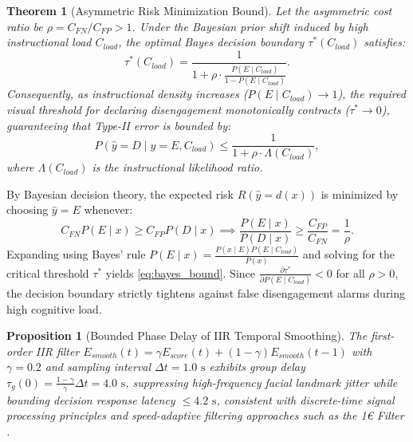 \documentclass[conference]{IEEEtran}
\newtheorem{theorem}{Theorem}
\newtheorem{proposition}{Proposition}
\begin{document}
\begin{theorem}[Asymmetric Risk Minimization Bound]
Let the asymmetric cost ratio be $\rho = C_{FN} / C_{FP} > 1$. Under the Bayesian prior shift induced by high instructional load $C_{load}$, the optimal Bayes decision boundary $\tau^*(C_{load})$ satisfies:
\begin{equation}
\tau^*(C_{load}) = \frac{1}{1 + \rho \cdot \frac{P(E \mid C_{load})}{1 - P(E \mid C_{load})}}.
\label{eq:bayes_bound}
\end{equation}
Consequently, as instructional density increases ($P(E \mid C_{load}) \to 1$), the required visual threshold for declaring disengagement monotonically contracts ($\tau^* \to 0$), guaranteeing that Type-II error is bounded by:
\begin{equation}
P(\hat{y}=D \mid y=E, C_{load}) \le \frac{1}{1 + \rho \cdot \Lambda(C_{load})},
\end{equation}
where $\Lambda(C_{load})$ is the instructional likelihood ratio.
\end{theorem}

\begin{IEEEproof}
By Bayesian decision theory, the expected risk $R(\hat{y}=d(x))$ is minimized by choosing $\hat{y}=E$ whenever:
\begin{equation}
C_{FN} P(E \mid x) \ge C_{FP} P(D \mid x) \implies \frac{P(E \mid x)}{P(D \mid x)} \ge \frac{C_{FP}}{C_{FN}} = \frac{1}{\rho}.
\end{equation}
Expanding using Bayes' rule $P(E \mid x) = \frac{P(x \mid E) P(E \mid C_{load})}{P(x)}$ and solving for the critical threshold $\tau^*$ yields \eqref{eq:bayes_bound}. Since $\frac{\partial \tau^*}{\partial P(E \mid C_{load})} < 0$ for all $\rho > 0$, the decision boundary strictly tightens against false disengagement alarms during high cognitive load.
\end{IEEEproof}

\begin{proposition}[Bounded Phase Delay of IIR Temporal Smoothing]
The first-order IIR filter $E_{smooth}(t) = \gamma E_{score}(t) + (1-\gamma) E_{smooth}(t-1)$ with $\gamma = 0.2$ and sampling interval $\Delta t = 1.0\text{ s}$ exhibits group delay $\tau_g(0) = \frac{1-\gamma}{\gamma} \Delta t = 4.0\text{ s}$, suppressing high-frequency facial landmark jitter while bounding decision response latency $\le 4.2\text{ s}$, consistent with discrete-time signal processing principles \cite{b15} and speed-adaptive filtering approaches such as the 1€ Filter \cite{b16}.
\end{proposition}
\end{document}
